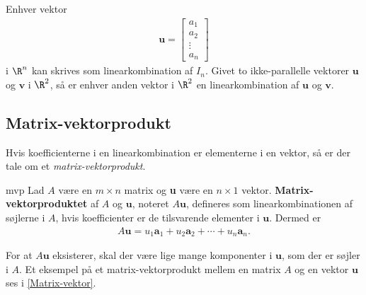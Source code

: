 %
%
Enhver vektor 
\begin{align*}
\textbf{u}=
\begin{bmatrix}
a_1 \\
a_2 \\
\vdots \\
a_n
\end{bmatrix}
\end{align*}
%
i $\R^n$ kan skrives som linearkombination af $I_n$. 
Givet to ikke-parallelle vektorer $\mathbf{u}$ og $\mathbf{v}$ i $\R^2$, så er enhver anden vektor i $\R^2$ en linearkombination af $\mathbf{u}$ og $\mathbf{v}$. 
%
\subsection{Matrix-vektorprodukt}
%
Hvis koefficienterne i en linearkombination er elementerne i en vektor, så er der tale om et \textit{matrix-vektorprodukt}.
%
%
\begin{defn}{}{mvp}
Lad $A$ være en $m \times n$ matrix og \textbf{u} være en $n \times 1$ vektor. 
\textbf{Matrix-vektorproduktet} af $A$ og $\textbf{u}$, noteret $A\textbf{u}$, defineres som linearkombinationen af søjlerne i $A$, hvis koefficienter er de tilsvarende elementer i $\textbf{u}$. 
Dermed er
%
\begin{align*}
A\textbf{u} =u_1\textbf{a}_1 + u_2\textbf{a}_2 + \cdots + u_n\textbf{a}_n.
\end{align*}
\end{defn}
\noindent
%
For at $A\textbf{u}$ eksisterer, skal der være lige mange komponenter i $\textbf{u}$, som der er søjler i $A$. 
Et eksempel på et matrix-vektorprodukt mellem en matrix $A$ og en vektor $\textbf{u}$ ses i \ref{Matrix-vektor}.
\\
%
